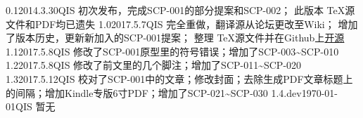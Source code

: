 


\begin{versionhistory}
	\vhEntry
	{0.1}{2014.3.30}{QIS}{
		初次发布，完成SCP-001的部分提案和SCP-002；
		此版本 \TeX 源文件和PDF均已遗失
	}
	\vhEntry
	{1.0}{2017.5.7}{QIS}{
		完全重做，翻译源从论坛更改至Wiki；
		增加了版本历史，更新新加入的SCP-001提案；
		整理 \TeX 源文件并在Github上\href{https://github.com/7sDream/scp-pdf}{开源}
	}
	\vhEntry
	{1.1}{2017.5.8}{QIS}{
		修改了SCP-001原型里的符号错误；增加了SCP-003\textasciitilde SCP-010
	}
	\vhEntry
	{1.2}{2017.5.8}{QIS}{
		修改了前文里的几个脚注；增加了SCP-011\textasciitilde SCP-020
	}
	\vhEntry
	{1.3}{2017.5.12}{QIS}{
		校对了SCP-001中的文章；修改封面；去除生成PDF文章标题上的间隔；增加Kindle专版6寸PDF；增加了SCP-021\textasciitilde SCP-030
	}
	\vhEntry
	{1.4.dev}{\today}{QIS}{
        暂无
	}
\end{versionhistory}
